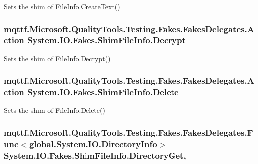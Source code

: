 Sets the shim of File\-Info.\-Create\-Text()

\hypertarget{class_system_1_1_i_o_1_1_fakes_1_1_shim_file_info_a53e2869347778976a8a067f86e90889c}{
\subsubsection[{Decrypt}]{\setlength{\rightskip}{0pt plus 5cm}mqttf.\-Microsoft.\-Quality\-Tools.\-Testing.\-Fakes.\-Fakes\-Delegates.\-Action System.\-I\-O.\-Fakes.\-Shim\-File\-Info.\-Decrypt\hspace{0.3cm}{\ttfamily [set]}}}\label{class_system_1_1_i_o_1_1_fakes_1_1_shim_file_info_a53e2869347778976a8a067f86e90889c}


Sets the shim of File\-Info.\-Decrypt()

\hypertarget{class_system_1_1_i_o_1_1_fakes_1_1_shim_file_info_a97001d675ebd5877d280b7e0d19183d6}{
\subsubsection[{Delete}]{\setlength{\rightskip}{0pt plus 5cm}mqttf.\-Microsoft.\-Quality\-Tools.\-Testing.\-Fakes.\-Fakes\-Delegates.\-Action System.\-I\-O.\-Fakes.\-Shim\-File\-Info.\-Delete\hspace{0.3cm}{\ttfamily [set]}}}\label{class_system_1_1_i_o_1_1_fakes_1_1_shim_file_info_a97001d675ebd5877d280b7e0d19183d6}


Sets the shim of File\-Info.\-Delete()

\hypertarget{class_system_1_1_i_o_1_1_fakes_1_1_shim_file_info_a2127bb8cd7ac6b6ef28c531ba4391374}{
\subsubsection[{Directory\-Get}]{\setlength{\rightskip}{0pt plus 5cm}mqttf.\-Microsoft.\-Quality\-Tools.\-Testing.\-Fakes.\-Fakes\-Delegates.\-Func$<$global.\-System.\-I\-O.\-Directory\-Info$>$ System.\-I\-O.\-Fakes.\-Shim\-File\-Info.\-Directory\-Get\hspace{0.3cm}{\ttfamily [get]}, {\ttfamily [set]}}}\label{class_system_1_1_i_o_1_1_fakes_1_1_shim_file_info_a2127bb8cd7ac6b6ef28c531ba4391374}


